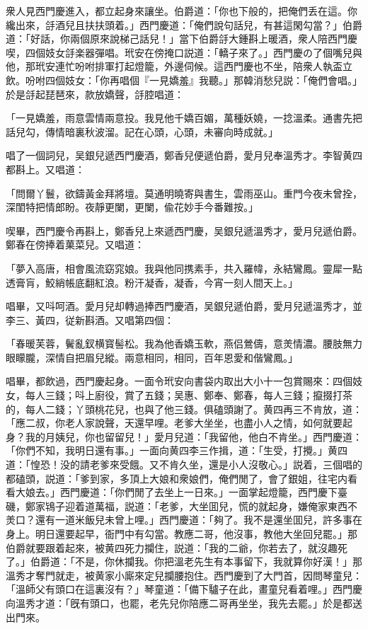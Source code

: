 衆人見西門慶進入，都立起身來讓坐。伯爵道：「你也下般的，把俺們丢在這。你纔出來，㧱酒兒且扶扶頭着。」西門慶道：「俺們說句話兒，有甚這閑勾當？」伯爵道：「好話，你兩個原來說梯己話兒！」當下伯爵㧱大鍾斟上暖酒，衆人陪西門慶喫，四個妓女㧱楽器彈唱。玳安在傍掩口説道：「轎子來了。」西門慶の了個嘴兒與他，那玳安連忙吩咐排軍打起燈籠，外邊伺候。這西門慶也不坐，陪衆人執盃立飲。吩咐四個妓女：「你再唱個『一見嬌羞』我聽。」那韓消愁兒説：「俺們會唱。」於是㧱起琵琶來，款放嬌聲，㧱腔唱道：

「一見嬌羞，雨意雲情兩意投。我見他千嬌百媚，萬種妖嬈，一捻溫柔。通書先把話兒勾，傳情暗裏秋波溜。記在心頭，心頭，未審向時成就。」

唱了一個詞兒，吴銀兒遞西門慶酒，鄭香兒便遞伯爵，愛月兒奉溫秀才。李智黄四都斟上。又唱道：

「問爾丫鬟，欲鑄黃金拜將壇。莫通明曉寄與書生，雲雨巫山。重門今夜未曾拴，深閨特把情郎盼。夜靜更闌，更闌，偸花妙手今番難按。」

喫畢，西門慶令再斟上，鄭香兒上來遞西門慶，吴銀兒遞溫秀才，愛月兒遞伯爵。鄭春在傍捧着菓菜兒。又唱道：

「夢入高唐，相會風流窈窕娘。我與他同携素手，共入羅幃，永結鸞鳳。靈犀一點透膏肓，鮫綃帳底翻紅浪。粉汗凝香，凝香，今宵一刻人間天上。」

唱畢，又呌呵酒。愛月兒却轉過捧西門慶酒，吴銀兒遞伯爵，愛月兒遞溫秀才，並李三、黃四，従新斟酒。又唱第四個：

「春暖芙蓉，鬢亂釵横寳髻松。我為他香嬌玉軟，燕侣鶯儔，意羙情濃。腰肢無力眼矇朧，深情自把眉兒縱。兩意相同，相同，百年恩愛和偕鸞鳳。」

唱畢，都飲過，西門慶起身。一面令玳安向書袋内取出大小十一包賞賜來：四個妓女，每人三錢；呌上廚役，賞了五錢；吴惠、鄭奉、鄭春，每人三錢；攛掇打茶的，每人二錢；丫頭桃花兒，也與了他三錢。俱磕頭謝了。黄四再三不肯放，道：「應二叔，你老人家說聲，天還早哩。老爹大坐坐，也盡小人之情，如何就要起身？我的月姨兒，你也留留兒！」愛月兒道：「我留他，他白不肯坐。」西門慶道：「你們不知，我明日還有事。」一面向黄四李三作揖，道：「生受，打攪。」黄四道：「惶恐！没的請老爹來受餓。又不肯久坐，還是小人沒敬心。」説着，三個唱的都磕頭，説道：「爹到家，多頂上大娘和衆娘們，俺們閒了，會了銀姐，往宅内看看大娘去。」西門慶道：「你們閒了去坐上一日來。」一面掌起燈籠，西門慶下臺磯，鄭家鴇子迎着道萬福，説道：「老爹，大坐囬兒，慌的就起身，嫌俺家東西不羙口？還有一道米飯兒未曾上哩。」西門慶道：「夠了。我不是還坐囬兒，許多事在身上。明日還要起早，衙門中有勾當。教應二哥，他沒事，教他大坐回兒罷。」那伯爵就要跟着起來，被黄四死力攔住，説道：「我的二爺，你若去了，就沒趣死了。」伯爵道：「不是，你休攔我。你把溫老先生有本事留下，我就算你好漢！」那溫秀才奪門就走，被黄家小廝來定兒攔腰抱住。西門慶到了大門首，因問琴童兒：「溫師父有頭口在這裏沒有？」琴童道：「備下驢子在此，畫童兒看着哩。」西門慶向溫秀才道：「旣有頭口，也罷，老先兒你陪應二哥再坐坐，我先去罷。」於是都送出門來。

